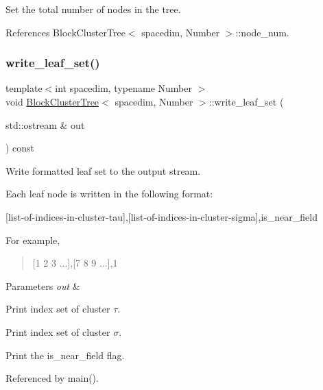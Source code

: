 Set the total number of nodes in the tree. 

References Block\+Cluster\+Tree$<$ spacedim, Number $>$\+::node\+\_\+num.

\mbox{\label{classBlockClusterTree_aef01b51b0530536bc5481492d4719375}} 
\subsubsection{\texorpdfstring{write\+\_\+leaf\+\_\+set()}{write\_leaf\_set()}\hspace{0.1cm}{\footnotesize\ttfamily [1/2]}}
{\footnotesize\ttfamily template$<$int spacedim, typename Number $>$ \\
void \hyperlink{classBlockClusterTree}{Block\+Cluster\+Tree}$<$ spacedim, Number $>$\+::write\+\_\+leaf\+\_\+set (\begin{DoxyParamCaption}\item[{std\+::ostream \&}]{out }\end{DoxyParamCaption}) const}

Write formatted leaf set to the output stream.

Each leaf node is written in the following format\+:

\begin{quote}


\end{quote}
\mbox{[}list-\/of-\/indices-\/in-\/cluster-\/tau\mbox{]},\mbox{[}list-\/of-\/indices-\/in-\/cluster-\/sigma\mbox{]},is\+\_\+near\+\_\+field

For example,

\begin{quote}
\mbox{[}1 2 3 ...\mbox{]},\mbox{[}7 8 9 ...\mbox{]},1 \end{quote}

\begin{DoxyParams}{Parameters}
{\em out} & \\
\hline
\end{DoxyParams}
Print index set of cluster $\tau$.

Print index set of cluster $\sigma$.

Print the {\ttfamily is\+\_\+near\+\_\+field} flag.

Referenced by main().

